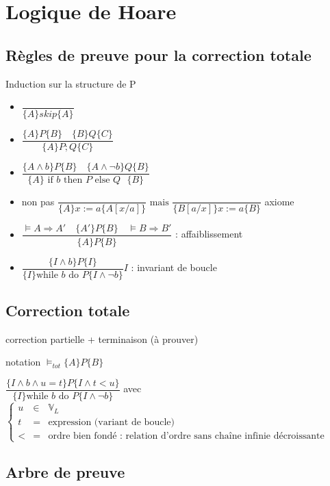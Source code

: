 \documentclass[10pt,a4paper]{article}
\newcommand{\Vs}{\mathbb{V}}
\begin{document}
\section{Logique de Hoare}
\subsection{Règles de preuve pour la correction totale}
Induction sur la structure de P
\begin{itemize}
 \item $\dfrac{}{\{A\}skip\{A\}}$\\
 \item $\dfrac{\{A\}P\{B\} \quad \{B\}Q\{C\}}{\{A\}P;Q\{C\}}$\\
 \item $\dfrac{\{A \wedge b\}P\{B\} \quad \{A \wedge \lnot b\}Q\{B\}}{\{A\}\text{ if $b$ then $P$ else $Q$ }\{B\}}$\\
 \item non pas $ \dfrac{}{\{A\}x := a\{A[x/a]\}}\text{ mais }\dfrac{}{\{B[a/x]\}x := a\{B\}}$ axiome\\
 \item $\dfrac{\models A \Rightarrow A' \quad \{A'\}P\{B\} \quad \models B \Rightarrow B'}{\{A\}P\{B\}}$ : affaiblissement\\
 \item $\dfrac{\{I \wedge b \}P\{I\}}{\{I\}\text{while $b$ do }P\{I \wedge \lnot b\}} I$ : invariant de boucle\\
\end{itemize}

\subsection{Correction totale}
correction partielle + terminaison (à prouver)

notation $\models_{tot} \{A\}P\{B\}$

$\dfrac{ \{I \wedge b \wedge u = t\}P\{I \wedge t<u\}}{\{I\}\text{while $b$ do $P$}\{I \wedge \lnot b\}}$ avec 
$\left\{\begin{array}{lcl}
 u & \in&  \Vs_L\\
t & = & \text{expression (variant de boucle)}\\
< & =& \text{ordre bien fondé : relation d'ordre sans chaîne infinie décroissante}
\end{array}\right.$

\subsection{Arbre de preuve}
\end{document}
